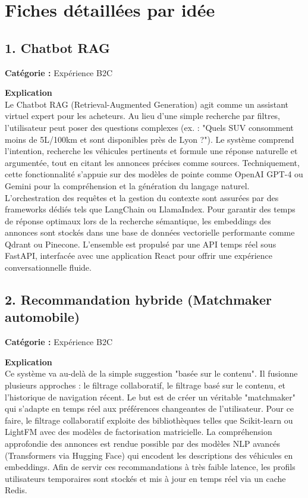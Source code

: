 \documentclass[11pt,a4paper]{article}
\begin{document}
\newpage
\section{Fiches détaillées par idée}

\subsection{1. Chatbot RAG}
\textbf{Catégorie :} Expérience B2C

\textbf{Explication}\\
Le Chatbot RAG (Retrieval-Augmented Generation) agit comme un assistant virtuel expert pour les acheteurs. Au lieu d'une simple recherche par filtres, l'utilisateur peut poser des questions complexes (ex. : "Quels SUV consomment moins de 5L/100km et sont disponibles près de Lyon ?"). Le système comprend l'intention, recherche les véhicules pertinents et formule une réponse naturelle et argumentée, tout en citant les annonces précises comme sources. Techniquement, cette fonctionnalité s'appuie sur des modèles de pointe comme OpenAI GPT-4 ou Gemini pour la compréhension et la génération du langage naturel. L'orchestration des requêtes et la gestion du contexte sont assurées par des frameworks dédiés tels que LangChain ou LlamaIndex. Pour garantir des temps de réponse optimaux lors de la recherche sémantique, les embeddings des annonces sont stockés dans une base de données vectorielle performante comme Qdrant ou Pinecone. L'ensemble est propulsé par une API temps réel sous FastAPI, interfacée avec une application React pour offrir une expérience conversationnelle fluide.

\subsection{2. Recommandation hybride (Matchmaker automobile)}
\textbf{Catégorie :} Expérience B2C

\textbf{Explication}\\
Ce système va au-delà de la simple suggestion "basée sur le contenu". Il fusionne plusieurs approches : le filtrage collaboratif, le filtrage basé sur le contenu, et l'historique de navigation récent. Le but est de créer un véritable "matchmaker" qui s'adapte en temps réel aux préférences changeantes de l'utilisateur. Pour ce faire, le filtrage collaboratif exploite des bibliothèques telles que Scikit-learn ou LightFM avec des modèles de factorisation matricielle. La compréhension approfondie des annonces est rendue possible par des modèles NLP avancés (Transformers via Hugging Face) qui encodent les descriptions des véhicules en embeddings. Afin de servir ces recommandations à très faible latence, les profils utilisateurs temporaires sont stockés et mis à jour en temps réel via un cache Redis.
\end{document}
